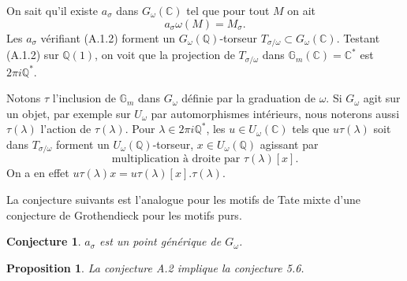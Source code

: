 \documentclass[11pt,a4paper]{article}
\theoremstyle{plain}
\newtheorem{proposition}[theorem]{Proposition}
\newtheorem{conjecture}[theorem]{Conjecture}
\theoremstyle{definition}
\newcommand{\Gm}{\mathbb{G}_m}
\newcommand{\Q}{\mathbb{Q}}
\newcommand{\C}{\mathbb{C}}
\begin{document}
On sait qu'il existe $a_\sigma$ dans $G_\omega(\C)$ tel que pour tout $M$ on ait
\begin{equation}\label{eq:A.1.2}
a_\sigma \omega(M) = M_\sigma.
\end{equation}
Les $a_\sigma$ v\'erifiant (A.1.2) forment un $G_\omega(\Q)$-torseur $T_{\sigma/\omega} \subset G_\omega(\C)$. Testant (A.1.2) sur $\Q(1)$, on voit que la projection de $T_{\sigma/\omega}$ dans $\Gm(\C) = \C^*$ est $2\pi i \Q^*$.

Notons $\tau$ l'inclusion de $\Gm$ dans $G_\omega$ d\'efinie par la graduation de $\omega$. Si $G_\omega$ agit sur un objet, par exemple sur $U_\omega$ par automorphismes int\'erieurs, nous noterons aussi $\tau(\lambda)$ l'action de $\tau(\lambda)$. Pour $\lambda \in 2\pi i \Q^*$, les $u \in U_\omega(\C)$ tels que $u \tau(\lambda)$ soit dans $T_{\sigma/\omega}$ forment un $U_\omega(\Q)$-torseur, $x \in U_\omega(\Q)$ agissant par
\begin{equation}\label{eq:A.1.3}
\text{multiplication \`a droite par } \tau(\lambda)[x].
\end{equation}
On a en effet $u \tau(\lambda) x = u \tau(\lambda)[x].\tau(\lambda)$.

La conjecture suivants est l'analogue pour les motifs de Tate mixte d'une conjecture de Grothendieck pour les motifs purs.

\begin{conjecture}\label{conj:A.2}
$a_\sigma$ est un point g\'en\'erique de $G_\omega$.
\end{conjecture}

\begin{proposition}\label{prop:A.3}
La conjecture A.2 implique la conjecture 5.6.
\end{proposition}
\end{document}
